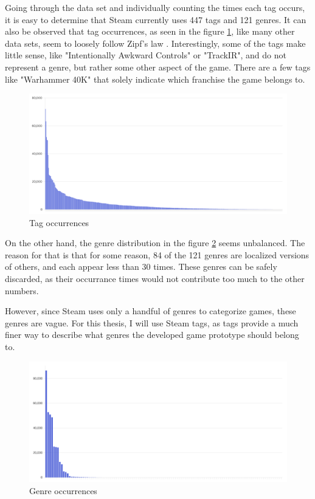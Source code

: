 Going through the data set and individually counting the times each tag occurs, it is easy to determine that Steam currently uses 447 tags and 121 genres. It can also be observed that tag occurrences, as seen in the figure \ref{figure:tags}, like many other data sets, seem to loosely follow Zipf's law \cite{li2002zipf}. Interestingly, some of the tags make little sense, like "Intentionally Awkward Controls" or "TrackIR", and do not represent a genre, but rather some other aspect of the game. There are a few tags like "Warhammer 40K" that solely indicate which franchise the game belongs to.

\begin{figure}[h]
    \centering
    \includegraphics[width=\textwidth]{images/tag-occurrences.png}
    \caption{Tag occurrences}
    \label{figure:tags}
\end{figure}

On the other hand, the genre distribution in the figure \ref{figure:genres} seems unbalanced. The reason for that is that for some reason, 84 of the 121 genres are localized versions of others, and each appear less than 30 times. These genres can be safely discarded, as their occurrance times would not contribute too much to the other numbers.

However, since Steam uses only a handful of genres to categorize games, these genres are vague. For this thesis, I will use Steam tags, as tags provide a much finer way to describe what genres the developed game prototype should belong to.

\begin{figure}[h]
    \centering
    \includegraphics[width=\textwidth]{images/genre-occurrences.png}
    \caption{Genre occurrences}
    \label{figure:genres}
\end{figure}

